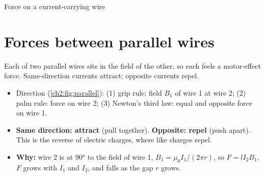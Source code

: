 \begin{formulacard}[unbreakable]{Force on a current-carrying wire}
  \begin{symbols}
  \end{symbols}
\end{formulacard}

\section{Forces between parallel wires}\label{ch2:sec:wires}

\begin{bigidea}
Each of two parallel wires sits in the field of the other, so each feels a motor-effect force.
Same-direction currents attract; opposite currents repel.
\end{bigidea}

\begin{keywords}
\end{keywords}

\begin{itemize}
  \item Direction (\cref{ch2:fig:parallel}): (1) grip rule: field $B_1$ of wire 1 at wire 2;
        (2) palm rule: force on wire 2; (3) Newton's third law: equal and opposite force on wire 1.
  \item \textbf{Same direction: attract} (pull together). \textbf{Opposite: repel} (push apart).
        This is the reverse of electric charges, where like charges repel.
  \item \textbf{Why:} wire 2 is at \ang{90} to the field of wire 1, $B_1 = \mu_0 I_1/(2\pi r)$,
        so $F = lI_2B_1$. $F$ grows with $I_1$ and $I_2$, and falls as the gap $r$ grows.
\end{itemize}

